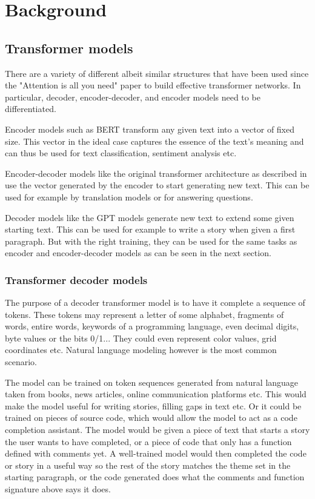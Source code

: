 \section{Background}

\subsection{Transformer models}

There are a variety of different albeit similar structures that have been used since the "Attention is all you need" paper to build effective transformer networks. In particular, decoder, encoder-decoder, and encoder models need to be differentiated.

Encoder models such as BERT \cite{devlin2019bert} transform any given text into a vector of fixed size. This vector in the ideal case captures the essence of the text's meaning and can thus be used for text classification, sentiment analysis etc.

Encoder-decoder models like the original transformer architecture as described in \cite{allyouneed} use the vector generated by the encoder to start generating new text. This can be used for example by translation models or for answering questions.

Decoder models like the GPT models \cite{radford2018improving} generate new text to extend some given starting text. This can be used for example to write a story when given a first paragraph. But with the right training, they can be used for the same tasks as encoder and encoder-decoder models as can be seen in the next section.

\subsubsection{Transformer decoder models}

The purpose of a decoder transformer model is to have it complete a sequence of tokens. These tokens may represent a letter of some alphabet, fragments of words, entire words, keywords of a programming language, even decimal digits, byte values or the bits 0/1...
They could even represent color values, grid coordinates etc. Natural language modeling however is the most common scenario.

The model can be trained on token sequences generated from natural language taken from books, news articles, online communication platforms etc. This would make the model useful for writing stories, filling gaps in text etc.
Or it could be trained on pieces of source code, which would allow the model to act as a code completion assistant.
The model would be given a piece of text that starts a story the user wants to have completed, or a piece of code that only has a function defined with comments yet. A well-trained model would then completed the code or story in a useful way so the rest of the story matches the theme set in the starting paragraph, or the code generated does what the comments and function signature above says it does.

